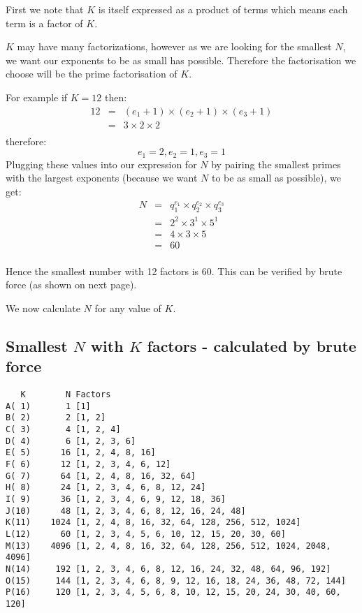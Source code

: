 \documentclass{article}
\begin{document}
First we note that $K$ is itself expressed as a product of terms which means each term is a factor of $K$. 

$K$ may have many factorizations, however as we are looking for the smallest $N$, we want our exponents to be as small has possible. 
Therefore the factorisation we choose will be the prime factorisation of $K$.

For example if $K = 12$ then:
\begin{eqnarray*}
12 
& = & ( e_1 + 1) \times ( e_2 + 1 ) \times (e_3 + 1) \\
& = & 3 \times 2 \times 2 \\
\end{eqnarray*}
therefore:
$$
e_1 = 2, e_2 = 1, e_3 = 1
$$
Plugging these values into our expression for $N$ by pairing the smallest primes with the largest exponents (because we want $N$ to be as small as possible), we get:
\begin{eqnarray*}
N
& = & q_1 ^ {e_1} \times q_2 ^ {e_2} \times q_3 ^ {e_3} \\
& = & 2^2 \times 3^1 \times 5^1 \\
& = & 4 \times 3 \times 5 \\
& = & 60 \\
\end{eqnarray*}

Hence the smallest number with 12 factors is 60. 
This can be verified by brute force (as shown on next page).

We now calculate $N$ for any value of $K$.

\pagebreak
\pagestyle{fancy}

\subsection*{Smallest $N$ with $K$ factors - calculated by brute force}
\begin{verbatim}
   K        N Factors
A( 1)       1 [1]
B( 2)       2 [1, 2]
C( 3)       4 [1, 2, 4]
D( 4)       6 [1, 2, 3, 6]
E( 5)      16 [1, 2, 4, 8, 16]
F( 6)      12 [1, 2, 3, 4, 6, 12]
G( 7)      64 [1, 2, 4, 8, 16, 32, 64]
H( 8)      24 [1, 2, 3, 4, 6, 8, 12, 24]
I( 9)      36 [1, 2, 3, 4, 6, 9, 12, 18, 36]
J(10)      48 [1, 2, 3, 4, 6, 8, 12, 16, 24, 48]
K(11)    1024 [1, 2, 4, 8, 16, 32, 64, 128, 256, 512, 1024]
L(12)      60 [1, 2, 3, 4, 5, 6, 10, 12, 15, 20, 30, 60]
M(13)    4096 [1, 2, 4, 8, 16, 32, 64, 128, 256, 512, 1024, 2048, 4096]
N(14)     192 [1, 2, 3, 4, 6, 8, 12, 16, 24, 32, 48, 64, 96, 192]
O(15)     144 [1, 2, 3, 4, 6, 8, 9, 12, 16, 18, 24, 36, 48, 72, 144]
P(16)     120 [1, 2, 3, 4, 5, 6, 8, 10, 12, 15, 20, 24, 30, 40, 60, 120]
\end{verbatim}
\end{document}
